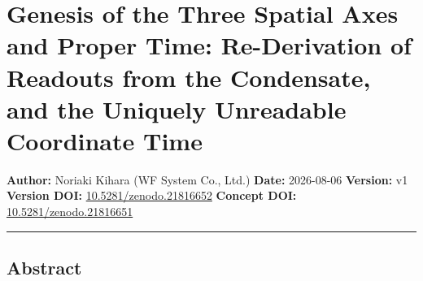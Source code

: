 \documentclass[
  a4paper,
]{article}
\author{}
\date{}
\begin{document}
\section{Genesis of the Three Spatial Axes and Proper Time:
Re-Derivation of Readouts from the Condensate, and the Uniquely
Unreadable Coordinate
Time}\label{genesis-of-the-three-spatial-axes-and-proper-time-re-derivation-of-readouts-from-the-condensate-and-the-uniquely-unreadable-coordinate-time}

\textbf{Author:} Noriaki Kihara (WF System Co., Ltd.) \textbf{Date:}
2026-08-06 \textbf{Version:} v1 \textbf{Version DOI:}
\href{https://doi.org/10.5281/zenodo.21816652}{10.5281/zenodo.21816652}
\textbf{Concept DOI:}
\href{https://doi.org/10.5281/zenodo.21816651}{10.5281/zenodo.21816651}

\begin{center}\rule{0.5\linewidth}{0.5pt}\end{center}

\subsection{Abstract}\label{abstract}
\end{document}
